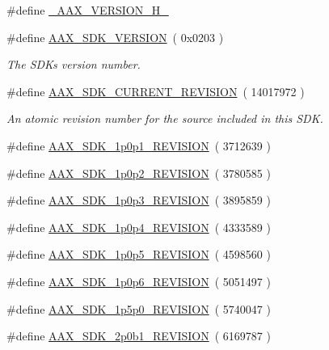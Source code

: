 \begin{DoxyCompactItemize}
\item 
\#define \mbox{\hyperlink{a00707_aa2233aa6f57ff48373eddf8aeda68919}{\+\_\+\+A\+A\+X\+\_\+\+V\+E\+R\+S\+I\+O\+N\+\_\+\+H\+\_\+}}
\item 
\#define \mbox{\hyperlink{a00707_aeff268cb7f4d2cc612df086c22b0f1f2}{A\+A\+X\+\_\+\+S\+D\+K\+\_\+\+V\+E\+R\+S\+I\+ON}}~( 0x0203 )
\begin{DoxyCompactList}\small\item\em The S\+DK\textquotesingle{}s version number. \end{DoxyCompactList}\item 
\#define \mbox{\hyperlink{a00707_a7ae13fba5243735a59c3a4dc2554a36f}{A\+A\+X\+\_\+\+S\+D\+K\+\_\+\+C\+U\+R\+R\+E\+N\+T\+\_\+\+R\+E\+V\+I\+S\+I\+ON}}~( 14017972 )
\begin{DoxyCompactList}\small\item\em An atomic revision number for the source included in this S\+DK. \end{DoxyCompactList}\item 
\#define \mbox{\hyperlink{a00707_a3f59e1c5a5a7563eeefe64b5781eba93}{A\+A\+X\+\_\+\+S\+D\+K\+\_\+1p0p1\+\_\+\+R\+E\+V\+I\+S\+I\+ON}}~( 3712639 )
\item 
\#define \mbox{\hyperlink{a00707_a978161f0a212f7c241e1bf22ceb25186}{A\+A\+X\+\_\+\+S\+D\+K\+\_\+1p0p2\+\_\+\+R\+E\+V\+I\+S\+I\+ON}}~( 3780585 )
\item 
\#define \mbox{\hyperlink{a00707_a95836b2270a2260faea2ce72723e270d}{A\+A\+X\+\_\+\+S\+D\+K\+\_\+1p0p3\+\_\+\+R\+E\+V\+I\+S\+I\+ON}}~( 3895859 )
\item 
\#define \mbox{\hyperlink{a00707_a82fcd612ff0206d62a970291eeec3f4f}{A\+A\+X\+\_\+\+S\+D\+K\+\_\+1p0p4\+\_\+\+R\+E\+V\+I\+S\+I\+ON}}~( 4333589 )
\item 
\#define \mbox{\hyperlink{a00707_ad5b3e00e4e86f396974336a66a3cc571}{A\+A\+X\+\_\+\+S\+D\+K\+\_\+1p0p5\+\_\+\+R\+E\+V\+I\+S\+I\+ON}}~( 4598560 )
\item 
\#define \mbox{\hyperlink{a00707_acb9944d960382eedc31c88615f56f011}{A\+A\+X\+\_\+\+S\+D\+K\+\_\+1p0p6\+\_\+\+R\+E\+V\+I\+S\+I\+ON}}~( 5051497 )
\item 
\#define \mbox{\hyperlink{a00707_a2a9775ce5518c002c9d101e7c29a57dc}{A\+A\+X\+\_\+\+S\+D\+K\+\_\+1p5p0\+\_\+\+R\+E\+V\+I\+S\+I\+ON}}~( 5740047 )
\item 
\#define \mbox{\hyperlink{a00707_a513661fadde1e27472578741905b857c}{A\+A\+X\+\_\+\+S\+D\+K\+\_\+2p0b1\+\_\+\+R\+E\+V\+I\+S\+I\+ON}}~( 6169787 )

\end{DoxyCompactItemize}

